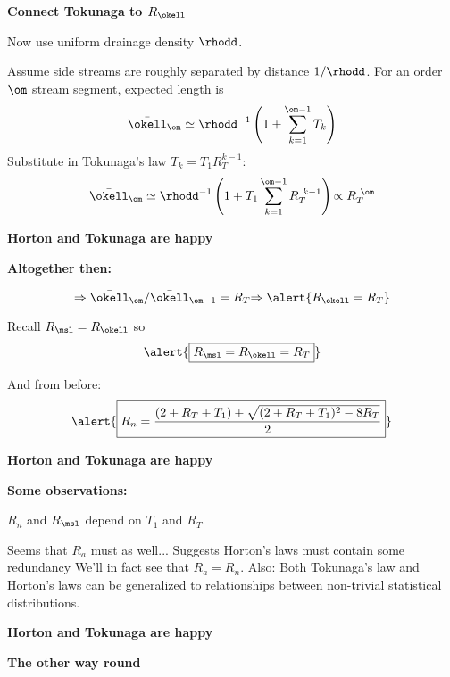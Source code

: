 \begin{frame}[label=]
\begin{frame}[label=]
\begin{frame}[label=]
\begin{frame}[label=]
\begin{frame}[label=]
  \textbf{Connect Tokunaga to $R_\okell$}
    
     
      Now use uniform drainage density $\rhodd$.
     
      Assume side streams are roughly separated
      by distance $1/\rhodd$.
     For an order $\om$ \alert{stream segment},
      expected length is 
      $$
      \bar{\okell}_\om
      \simeq
      \rhodd^{-1}
      \left(
        1 + \sum_{k=1}^{\om-1} T_k
      \right)
      $$
     Substitute in Tokunaga's law $T_k = T_1 R_T^{k-1}$:
      $$
      \bar{\okell}_\om
      \simeq
      \rhodd^{-1}
      \left(
        1 + T_1 \sum_{k=1}^{\om-1} R_T^{\ k-1}
      \right)
      {
      \propto
      R_T^{\ \om}
      }
      $$
    
  


\begin{frame}[label=]
  \textbf{Horton and Tokunaga are happy}

  \textbf{Altogether then:}
  
   
      $$ \Rightarrow \bar{\okell}_\om/\bar{\okell}_{\om-1} = R_T
      {
        \Rightarrow \alert{R_\okell = R_T} 
      }
      $$
    
      Recall $R_\msl = R_\okell$ so 
      $$ 
      \alert{\boxed{R_\msl = R_\okell =  R_T}}
      $$
    
      And from before:
      $$
      \alert{\boxed{
      R_n
      =
      \frac{
      (2+R_T+T_1)
      +
      \sqrt{
        (2+R_T+T_1)^2-8R_T
        }
      }
      {2}
    }}
      $$
  
  



\begin{frame}[label=]
  \textbf{Horton and Tokunaga are happy}

  \textbf{Some observations:}
    
    
      $R_n$ and $R_\msl$ depend on $T_1$ and $R_T$.
    
      Seems that $R_a$ must as well...
     Suggests Horton's laws must contain some redundancy
     We'll in fact see that $R_a = R_n$.
     Also: Both Tokunaga's law and Horton's laws
      can be generalized to relationships between
      non-trivial statistical distributions.\cite{dodds2001b,dodds2001c}
    
  


\begin{frame}[label=]
  \textbf{Horton and Tokunaga are happy}
  
  \textbf{The other way round}
    

\end{frame}
\end{frame}
\end{frame}
\end{frame}
\end{frame}
\end{frame}
\end{frame}
\end{frame}
